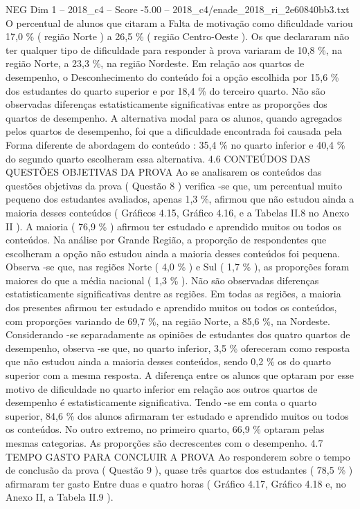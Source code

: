 \begin{textsample}{NEG Dim 1 – 2018\_c4 – Score -5.00 – 2018\_c4/enade\_2018\_ri\_2e60840bb3.txt}
O percentual de alunos que citaram a Falta de motivação como dificuldade variou 17,0 \% ( região Norte ) a 26,5 \% ( região Centro-Oeste ).
Os que declararam não ter qualquer tipo de dificuldade para responder à prova variaram de 10,8 \%, na região Norte, a 23,3 \%, na região Nordeste.
Em relação aos quartos de desempenho, o Desconhecimento do conteúdo foi a opção escolhida por 15,6 \% dos estudantes do quarto superior e por 18,4 \% do terceiro quarto.
Não são observadas diferenças estatisticamente significativas entre as proporções dos quartos de desempenho.
A alternativa modal para os alunos, quando agregados pelos quartos de desempenho, foi que a dificuldade encontrada foi causada pela Forma diferente de abordagem do conteúdo : 35,4 \% no quarto inferior e 40,4 \% do segundo quarto escolheram essa alternativa. 4.6 CONTEÚDOS DAS QUESTÕES OBJETIVAS DA PROVA Ao se analisarem os conteúdos das questões objetivas da prova ( Questão 8 ) verifica -se que, um percentual muito pequeno dos estudantes avaliados, apenas 1,3 \%, afirmou que não estudou ainda a maioria desses conteúdos ( Gráficos 4.15, Gráfico 4.16, e a Tabelas II.8 no Anexo II ).
A maioria ( 76,9 \% ) afirmou ter estudado e aprendido muitos ou todos os conteúdos.
Na análise por Grande Região, a proporção de respondentes que escolheram a opção não estudou ainda a maioria desses conteúdos foi pequena.
Observa -se que, nas regiões Norte ( 4,0 \% ) e Sul ( 1,7 \% ), as proporções foram maiores do que a média nacional ( 1,3 \% ).
Não são observadas diferenças estatisticamente significativas dentre as regiões.
Em todas as regiões, a maioria dos presentes afirmou ter estudado e aprendido muitos ou todos os conteúdos, com proporções variando de 69,7 \%, na região Norte, a 85,6 \%, na Nordeste.
Considerando -se separadamente as opiniões de estudantes dos quatro quartos de desempenho, observa -se que, no quarto inferior, 3,5 \% ofereceram como resposta que não estudou ainda a maioria desses conteúdos, sendo 0,2 \% os do quarto superior com a mesma resposta.
A diferença entre os alunos que optaram por esse motivo de dificuldade no quarto inferior em relação aos outros quartos de desempenho é estatisticamente significativa.
Tendo -se em conta o quarto superior, 84,6 \% dos alunos afirmaram ter estudado e aprendido muitos ou todos os conteúdos.
No outro extremo, no primeiro quarto, 66,9 \% optaram pelas mesmas categorias.
As proporções são decrescentes com o desempenho. 4.7 TEMPO GASTO PARA CONCLUIR A PROVA Ao responderem sobre o tempo de conclusão da prova ( Questão 9 ), quase três quartos dos estudantes ( 78,5 \% ) afirmaram ter gasto Entre duas e quatro horas ( Gráfico 4.17, Gráfico 4.18 e, no Anexo II, a Tabela II.9 ).

\end{textsample}
